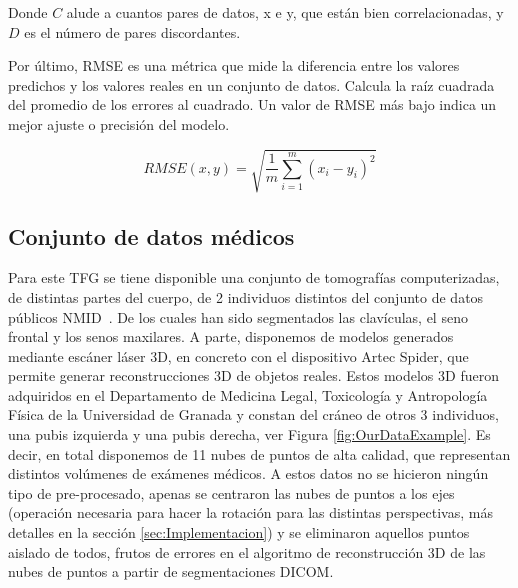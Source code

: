 Donde $C$ alude a cuantos pares de datos, x e y, que están bien correlacionadas, 
y $D$ es el número de pares discordantes.  

Por último, RMSE es una métrica que mide la diferencia entre los valores 
predichos y los valores reales en un conjunto de datos. 
Calcula la raíz cuadrada del promedio de los errores al cuadrado. 
Un valor de RMSE más bajo indica un mejor ajuste o precisión del modelo.

\begin{equation}
  RMSE(x,y) = \sqrt{\frac{1}{m}\sum_{i=1}^m (x_i - y_i)^2}
\label{eq:RMSE}
\end{equation}

\subsection{Conjunto de datos médicos}
\label{sec:OurData}
Para este TFG se tiene disponible una conjunto de tomografías computerizadas, de distintas
partes del cuerpo, de 2 individuos distintos del conjunto de datos públicos NMID~\cite{NMID}. 
De los cuales han sido segmentados las clavículas, el seno frontal y los senos maxilares. 
A parte, disponemos de modelos generados mediante escáner láser 3D, en concreto con el dispositivo Artec Spider, que permite generar reconstrucciones 3D de objetos reales. Estos modelos 3D fueron adquiridos en el Departamento de Medicina Legal, Toxicología y Antropología Física de la Universidad de Granada y constan del cráneo de otros 3 individuos, una pubis izquierda y
una pubis derecha, ver Figura \ref{fig:OurDataExample}. Es decir, en total disponemos de 11 nubes de puntos de alta 
calidad, que representan distintos volúmenes de exámenes médicos.
A estos datos no se hicieron ningún tipo de pre-procesado, apenas se centraron 
las nubes de puntos a los ejes (operación necesaria para hacer la rotación para 
las distintas perspectivas, más detalles en la sección \ref{sec:Implementacion})
y se eliminaron aquellos puntos aislado de todos, frutos de errores en el 
algoritmo de reconstrucción 3D de las nubes de puntos a partir de segmentaciones DICOM. 

